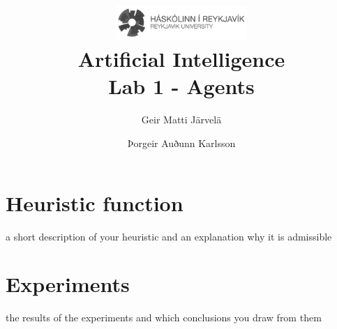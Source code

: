 \documentclass[11pt]{article}
\title{\includegraphics[width=5cm]{HR-Logo-bw} \\Artificial Intelligence\\ Lab 1 - Agents}
\author{Geir Matti Järvelä \and Þorgeir Auðunn Karlsson}
\begin{document}
\maketitle
\section{Heuristic function}
 a short description of your heuristic and an explanation why it is admissible

\section{Experiments}

the results of the experiments and which conclusions you draw from them
\end{document}
